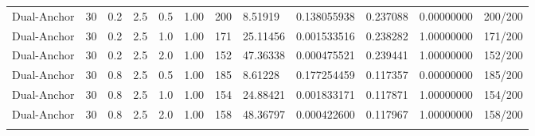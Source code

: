 \begin{longtable}{llllllllllll}
Dual-Anchor & 30 & 0.2 & 2.5 & 0.5 & 1.00 & 200 & 8.51919 & 0.138055938 & 0.237088 & 0.00000000 & 200/200 \\ \addlinespace[3pt]
Dual-Anchor & 30 & 0.2 & 2.5 & 1.0 & 1.00 & 171 & 25.11456 & 0.001533516 & 0.238282 & 1.00000000 & 171/200 \\ \addlinespace[3pt]
Dual-Anchor & 30 & 0.2 & 2.5 & 2.0 & 1.00 & 152 & 47.36338 & 0.000475521 & 0.239441 & 1.00000000 & 152/200 \\ \addlinespace[3pt]
Dual-Anchor & 30 & 0.8 & 2.5 & 0.5 & 1.00 & 185 & 8.61228 & 0.177254459 & 0.117357 & 0.00000000 & 185/200 \\ \addlinespace[3pt]
Dual-Anchor & 30 & 0.8 & 2.5 & 1.0 & 1.00 & 154 & 24.88421 & 0.001833171 & 0.117871 & 1.00000000 & 154/200 \\ \addlinespace[3pt]
Dual-Anchor & 30 & 0.8 & 2.5 & 2.0 & 1.00 & 158 & 48.36797 & 0.000422600 & 0.117967 & 1.00000000 & 158/200 \\ \addlinespace[3pt]
\bottomrule\end{longtable}
